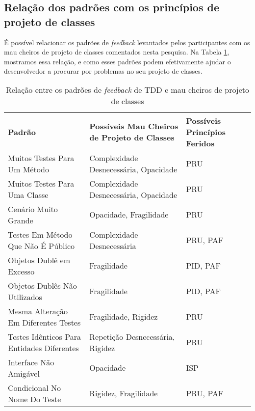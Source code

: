 \subsection{Relação dos padrões com os princípios de projeto de classes}

É possível relacionar os padrões de \textit{feedback} levantados pelos participantes
com os mau cheiros de projeto de classes comentados nesta pesquisa. Na Tabela \ref{tab:relacao-padroes},
mostramos essa relação, e como esses padrões podem efetivamente ajudar o desenvolvedor
a procurar por problemas no seu projeto de classes.


\begin{table}[h!]
	\centering
	\begin{tabular}{| p{7.5cm} | p{5cm} | p{2.5cm} | }
		\hline

		Padrão & Possíveis Mau Cheiros de Projeto de Classes & Possíveis Princípios Feridos\\
		
		\hline

		Muitos Testes Para Um Método                   & Complexidade Desnecessária, Opacidade   & PRU \\ \hline
		Muitos Testes Para Uma Classe                  & Complexidade Desnecessária, Opacidade   & PRU \\ \hline
		Cenário Muito Grande                           & Opacidade, Fragilidade                  & PRU \\ \hline
		Testes Em Método Que Não É Público             & Complexidade Desnecessária              & PRU, PAF \\ \hline
		Objetos Dublê em Excesso                       & Fragilidade                             & PID, PAF \\ \hline
		Objetos Dublês Não Utilizados                  & Fragilidade                             & PID, PAF \\ \hline
		Mesma Alteração Em Diferentes Testes           & Fragilidade, Rigidez                    & PRU \\ \hline
		Testes Idênticos Para Entidades Diferentes     & Repetição Desnecessária, Rigidez        & PRU  \\ \hline
		Interface Não Amigável                         & Opacidade                               & ISP \\ \hline
		Condicional No Nome Do Teste                   & Rigidez, Fragilidade                    & PRU, PAF \\

		\hline
		
	\end{tabular}
	\caption{Relação entre os padrões de \textit{feedback} de TDD e mau cheiros de projeto de classes}
	\label{tab:relacao-padroes}
\end{table}
